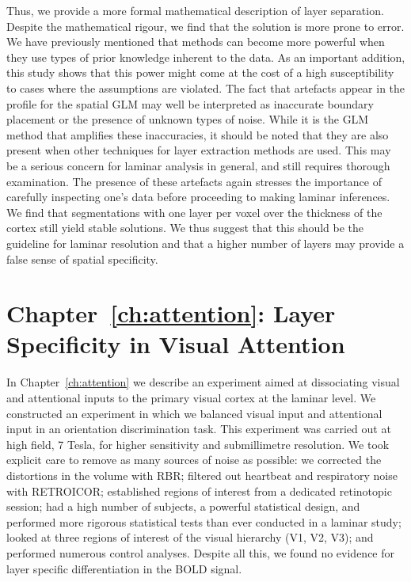 Thus, we provide a more formal mathematical description of layer separation. Despite the mathematical rigour, we find that the solution is more prone to error. We have previously mentioned that methods can become more powerful when they use types of prior knowledge inherent to the data. As an important addition, this study shows that this power might come at the cost of a high susceptibility to cases where the assumptions are violated. The fact that artefacts appear in the profile for the spatial GLM may well be interpreted as inaccurate boundary placement or the presence of unknown types of noise. While it is the GLM method that amplifies these inaccuracies, it should be noted that they are also present when other techniques for layer extraction methods are used. This may be a serious concern for laminar analysis in general, and still requires thorough examination. The presence of these artefacts again stresses the importance of carefully inspecting one's data before proceeding to making laminar inferences. We find that segmentations with one layer per voxel over the thickness of the cortex still yield stable solutions. We thus suggest that this should be the guideline for laminar resolution and that a higher number of layers may provide a false sense of spatial specificity.

\section*{Chapter~\ref{ch:attention}: Layer Specificity in Visual Attention}
In Chapter~\ref{ch:attention} we describe an experiment aimed at dissociating visual and attentional inputs to the primary visual cortex at the laminar level. We constructed an experiment in which we balanced visual input and attentional input in an orientation discrimination task. This experiment was carried out at high field, 7 Tesla, for higher sensitivity and submillimetre resolution. We took explicit care to remove as many sources of noise as possible: we corrected the distortions in the volume with RBR; filtered out heartbeat and respiratory noise with RETROICOR; established regions of interest from a dedicated retinotopic session; had a high number of subjects, a powerful statistical design, and performed more rigorous statistical tests than ever conducted in a laminar study; looked at three regions of interest of the visual hierarchy (V1, V2, V3); and performed numerous control analyses. Despite all this, we found no evidence for layer specific differentiation in the BOLD signal.

